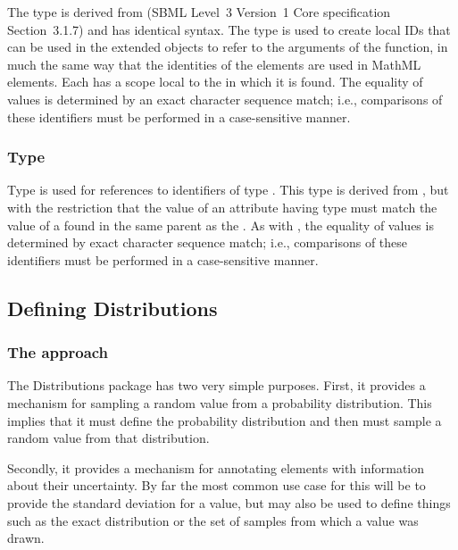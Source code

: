 \documentclass[draftspec]{sbmlpkgspec}
\newcommand{\fixttspace}{\hspace*{1pt}}
\newcommand{\sbmlthreecore}{SBML Level~3 Version~1 Core\xspace}
\newcommand{\distrib}{Distributions\xspace}
\begin{document}
The type  is derived from  (\sbmlthreecore specification Section~3.1.7) and has identical syntax.  The  type is used to create local IDs that can be used in the extended \FunctionDefinition objects to refer to the arguments of the function, in much the same way that the identities of the  elements are used in MathML  elements.  Each  has a scope local to the \FunctionDefinition in which it is found.  The
equality of  values is determined by an exact
character sequence match; i.e., comparisons of these identifiers must be
performed in a case-sensitive manner.


\subsubsection{Type \fixttspace{}}
\label{primtype-portidref}

Type  is used for references to
identifiers of type .  This type is derived from
, but with the restriction that the value of an
attribute having type  must match the value of a
 found in the same parent \FunctionDefinition as the
.  As with , the equality of
 values is determined by exact character sequence
match; i.e., comparisons of these identifiers must be performed in a
case-sensitive manner.



\subsection{Defining Distributions}

\subsubsection{The approach}

The \distrib package has two very simple purposes. First, it provides a
mechanism for sampling a random value from a probability
distribution. This implies that it must define the probability distribution and then must sample a
random value from that distribution.

Secondly, it provides a mechanism for annotating elements with information about their uncertainty.  By far the most common use case for this will be to provide the standard deviation for a value, but may also be used to define things such as the exact distribution or the set of samples from which a value was drawn.
\end{document}
